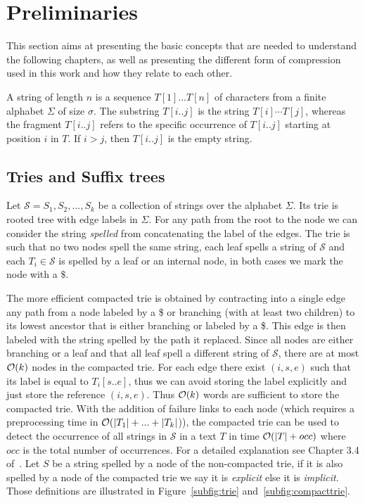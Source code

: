 \section{Preliminaries}\label{sec:prelim}

This section aims at presenting the basic concepts that are needed to understand the following chapters, as well as presenting the different form of compression used in this work and how they relate to each other.

A string of length $n$ is a sequence $T[1] \dots T[n]$ of characters from a finite alphabet $\Sigma$ of size $\sigma$. The substring $T[i..j]$ is the string $T[i] \cdots T[j]$, whereas the fragment $T[i..j]$ refers to the specific occurrence of $T[i..j]$ starting at position $i$ in $T$. If $i > j$, then $T[i..j]$ is the empty string.

\subsection{Tries and Suffix trees}

Let $\mathcal{S} = {S_1,S_2, ..., S_k}$ be a collection of strings over the alphabet $\Sigma$. Its trie is rooted tree with edge labels in $\Sigma$.
For any path from the root to the node we can consider the string \emph{spelled} from concatenating the label of the edges. The trie is such that no two nodes spell the same string, each leaf spells a string of $\mathcal{S}$ and each $T_i \in \mathcal{S}$ is spelled by a leaf or an internal node, in both cases we mark the node with a $\$ $.

The more efficient compacted trie is obtained by contracting  into a single edge any path from a node labeled by a \$ or branching (with at least two children) to its lowest ancestor that is either branching or labeled by a \$.
This edge is then labeled with the string spelled by the path it replaced.
Since all nodes are either branching or a leaf and that all leaf spell a different string of $\mathcal{S}$, there are at most $\mathcal{O}(k)$ nodes in the compacted trie.
For each edge there exist $(i,s,e)$ such that its label is equal to $T_i[s .. e]$, thus we can avoid storing the label explicitly and just store the reference $(i,s,e)$.
%
Thus $\mathcal{O}(k)$ words are sufficient to store the compacted trie.
With the addition of failure links to each node (which requires a preprocessing time in $\mathcal{O}(|T_1| + ... +|T_k|$)), the compacted trie can be used to detect the occurrence of all strings in $\mathcal{S}$ in a text $T$ in time $\mathcal{O}(|T|+occ)$ where $occ$ is the total number of occurrences. For a detailed explanation see Chapter 3.4 of~\cite{Gusfield1997}. Let $S$ be a string spelled by a node of the non-compacted trie, if it is also spelled by a node of the compacted trie we say it is \emph{explicit} else it is \emph{implicit}. Those definitions are illustrated in Figure~\ref{subfig:trie} and~\ref{subfig:compacttrie}.


